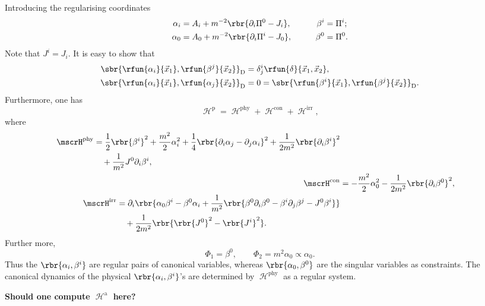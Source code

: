 \documentclass[a4paper,11pt]{article}
\begin{document}
Introducing the regularising coordinates
\begin{alignat}{3}
\alpha_i &= A_i + m^{-2}\rbr{\partial_i \Pi^0 - J_i},&\qquad \beta^i &= \Pi^i; 
\\
\alpha_0 &= A_0 + m^{-2}\rbr{\partial_i \Pi^i - J_0},&\qquad \beta^0 &= \Pi^0.
\end{alignat}
Note that $J^i = J_i$. It is easy to show that
\begin{align}
\sbr{\rfun{\alpha_i}{\vec{x}_1},\rfun{\beta^j}{\vec{x}_2}}_\text{D} &= 
\delta^i_j\rfun{\delta}{\vec{x}_1,\vec{x}_2},\\
\sbr{\rfun{\alpha_i}{\vec{x}_1},\rfun{\alpha_j}{\vec{x}_2}}_\text{D} &= 0 =
\sbr{\rfun{\beta^i}{\vec{x}_1},\rfun{\beta^j}{\vec{x}_2}}_\text{D}.
\end{align}
Furthermore, one has
\begin{equation}
\mscrH^\text{p} = \mscrH^\text{phy}+\mscrH^\text{con}+\mscrH^\text{irr},
\end{equation}
where
\begin{align}
\begin{split}
\mscrH^\text{phy} &= \frac{1}{2}\rbr{\beta^i}^2 + \frac{m^2}{2}\alpha_i^2 +
\frac{1}{4}\rbr{\partial_i \alpha_j - \partial_j \alpha_i}^2 + 
\frac{1}{2m^2}\rbr{\partial_i \beta^i}^2 \\
&\quad +\frac{1}{m^2} J^0 \partial_i \beta^i,
\end{split}\\
\mscrH^\text{con} &= -\frac{m^2}{2}\alpha_0^2 - \frac{1}{2m^2} 
\rbr{\partial_i \beta^0}^2,\\
\begin{split}
\mscrH^\text{irr} &= \partial_i\rbr{\alpha_0\beta^i - \beta^0\alpha_i + 
\frac{1}{m^2}\rbr{\beta^0\partial_i\beta^0 - 
\beta^i\partial_j\beta^j - J^0 \beta^i}} \\
&\quad + \frac{1}{2m^2}\rbr{\rbr{J^0}^2 - \rbr{J^i}^2}.
\end{split}
\end{align}
Further more,
\begin{equation}
\Phi_1 = \beta^0,\qquad\Phi_2 = m^2\alpha_0 \propto \alpha_0.
\end{equation}
Thus the $\rbr{\alpha_i, \beta^i}$ are regular pairs of canonical variables, 
whereas $\rbr{\alpha_0, \beta^0}$ are the singular variables as constraints. 
The canonical dynamics of the physical $\rbr{\alpha_i, \beta^i}$'s are 
determined by $\mscrH^\text{phy}$ as a regular system.

\textbf{Should one compute $\mscrH^\text{a}$ here?}


\printbibliography
\end{document}
